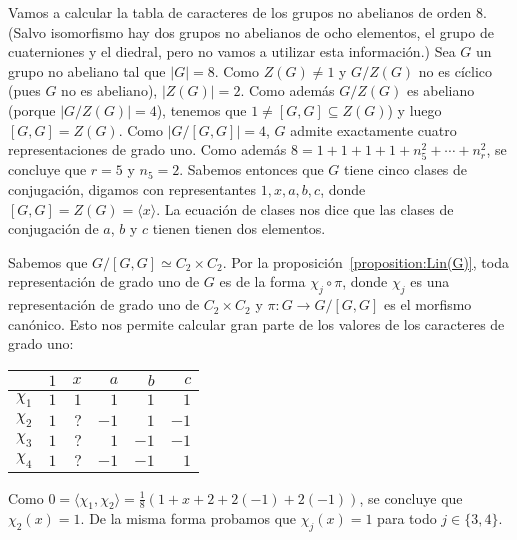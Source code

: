 \begin{example}
	Vamos a calcular la tabla de caracteres de los grupos no abelianos de orden
	$8$. (Salvo isomorfismo hay dos grupos no abelianos de ocho elementos, el
	grupo de cuaterniones y el diedral, pero no vamos a utilizar esta
	información.) Sea $G$ un grupo no abeliano tal que $|G|=8$. Como $Z(G)\ne
	1$ y $G/Z(G)$ no es cíclico (pues $G$ no es abeliano), $|Z(G)|=2$. Como
	además $G/Z(G)$ es abeliano (porque $|G/Z(G)|=4$), tenemos que $1\ne
	[G,G]\subseteq Z(G)$) y luego $[G,G]=Z(G)$. Como $|G/[G,G]|=4$, $G$ admite
	exactamente cuatro representaciones de grado uno. Como además
	$8=1+1+1+1+n_5^2+\cdots+n_r^2$, se concluye que $r=5$ y $n_5=2$.  Sabemos
	entonces que $G$ tiene cinco clases de conjugación, digamos con
	representantes $1,x,a,b,c$, donde $[G,G]=Z(G)=\langle x\rangle$.  La
	ecuación de clases nos dice que las clases de conjugación de $a$, $b$ y $c$
	tienen tienen dos elementos. 

	Sabemos que $G/[G,G]\simeq C_2\times C_2$. Por la
	proposición~\ref{proposition:Lin(G)}, toda representación de grado uno de
	$G$ es de la forma $\chi_j\circ\pi$, donde $\chi_j$ es una representación
	de grado uno de $C_2\times C_2$ y $\pi\colon G\to G/[G,G]$ es el morfismo
	canónico. Esto nos permite calcular gran parte de los valores de los
	caracteres de grado uno:
	\begin{center}
		\begin{tabular}{|c|rrrrr|}
			\hline
			& $1$ & $x$ & $a$ & $b$ & $c$\tabularnewline
			\hline
			$\chi_1$ & $1$ & $1$ & $1$ & $1$ & $1$\tabularnewline
			$\chi_2$ & $1$ & $?$ & $-1$ & $1$ & $-1$\tabularnewline
			$\chi_3$ & $1$ & $?$ & $1$ & $-1$ & $-1$\tabularnewline
			$\chi_4$ & $1$ & $?$ & $-1$ & $-1$ & $1$\tabularnewline
			\hline
		\end{tabular}
	\end{center}
	Como $0=\langle \chi_1,\chi_2\rangle=\frac18(1+x+2+2(-1)+2(-1))$, se
	concluye que $\chi_2(x)=1$. De la misma forma probamos que $\chi_j(x)=1$
	para todo $j\in\{3,4\}$. 
	

\end{example}
